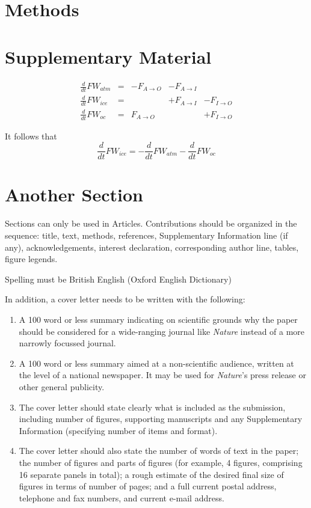\documentclass{naturemod}
\newcommand{\od}[2]{\ensuremath{\frac{d #1}{d #2}}}
\begin{document}
\section*{Methods}

\section*{Supplementary Material}

\begin{align}
&\od{}{t}FW_{atm} & = &- F_{A \to O} & -F_{A \to I}  & \ 		  & \\
&\od{}{t}FW_{ice}  & = & \		       & + F_{A \to I} & - F_{I \to O}& \\
&\od{}{t}FW_{oc}  & =  & F_{A \to O}  & \                  & + F_{I \to O}& 
\end{align}

It follows that
\begin{equation}
\od{}{t}FW_{ice} = -\od{}{t}FW_{atm} - \od{}{t}FW_{oc} 
\end{equation}


\section*{Another Section}

Sections can only be used in Articles.  Contributions should be
organized in the sequence: title, text, methods, references,
Supplementary Information line (if any), acknowledgements,
interest declaration, corresponding author line, tables, figure
legends.

Spelling must be British English (Oxford English Dictionary)

In addition, a cover letter needs to be written with the
following:
\begin{enumerate}
 \item A 100 word or less summary indicating on scientific grounds
why the paper should be considered for a wide-ranging journal like
\textsl{Nature} instead of a more narrowly focussed journal.
 \item A 100 word or less summary aimed at a non-scientific audience,
written at the level of a national newspaper.  It may be used for
\textsl{Nature}'s press release or other general publicity.
 \item The cover letter should state clearly what is included as the
submission, including number of figures, supporting manuscripts
and any Supplementary Information (specifying number of items and
format).
 \item The cover letter should also state the number of
words of text in the paper; the number of figures and parts of
figures (for example, 4 figures, comprising 16 separate panels in
total); a rough estimate of the desired final size of figures in
terms of number of pages; and a full current postal address,
telephone and fax numbers, and current e-mail address.
\end{enumerate}
\end{document}
